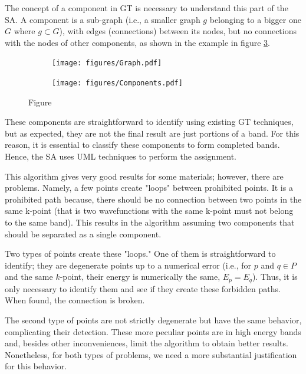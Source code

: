 \documentclass[a4paper,12pt]{report}
\begin{document}
\begin{appendices}
The concept of a component in GT is necessary to understand this part of the SA.
A component is a sub-graph (i.e., a smaller graph $g$ belonging to a bigger one $G$ where $g\subset G$), with edges (connections) between its nodes, but no connections with the nodes of other components, as shown in the example in figure \ref{fig:components}.


\begin{figure}
    \centering
    \begin{subfigure}[b]{0.45\textwidth}
        \centering
        \texttt{[image: figures/Graph.pdf]}
        \caption{}
        \label{fig:Ca}
    \end{subfigure}
    \hfill
    \begin{subfigure}[b]{0.45\textwidth}
        \centering
        \texttt{[image: figures/Components.pdf]}
        \caption{}
        \label{fig:Cb}
    \end{subfigure}
    \caption{Figure }%
    \label{fig:components}
\end{figure}

These components are straightforward to identify using existing GT techniques, but as expected, they are not the final result are just portions of a band.
For this reason, it is essential to classify these components to form completed bands.
Hence, the SA uses UML techniques to perform the assignment.

This algorithm gives very good results for some materials; however, there are problems.
Namely, a few points create "loops" between prohibited points.
It is a prohibited path because, there should be no connection between two points in the same k-point (that is two wavefunctions with the same k-point must not belong to the same band).
This results in the algorithm assuming two components that should be separated as a single component.


Two types of points create these "loops."
One of them is straightforward to identify; they are degenerate points up to a numerical error
(i.e., for $p$ and $q \in P$ and the same $k$-point, their energy is numerically the same, $E_p=E_q$).
Thus, it is only necessary to identify them and see if they create these forbidden paths.
When found, the connection is broken.

The second type of points are not strictly degenerate but have the same behavior, complicating their detection.
These more peculiar points are in high energy bands and, besides other inconveniences, limit the algorithm to obtain better results.
Nonetheless, for both types of problems, we need a more substantial justification for this behavior.





\end{appendices}
\end{document}
